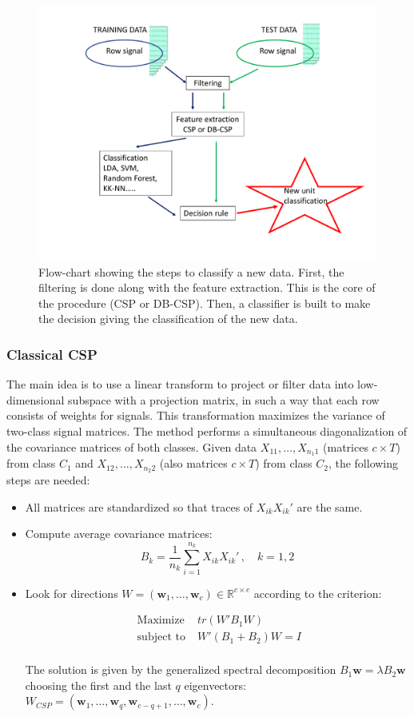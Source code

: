 \begin{figure}
    \centering
    \includegraphics[width=13cm]{Figure1.pdf}
    \caption{Flow-chart showing the steps to classify a new data. First, the filtering is done along with the feature extraction. This is the core of the procedure (CSP or DB-CSP). Then, a classifier is built to make the decision giving the classification of the new data. }
    \label{fig:F1}
\end{figure}

\subsubsection{Classical CSP}
The main idea is to use a linear transform to project or filter data into low-dimensional subspace with a projection matrix, in such a way that each row consists of weights for signals. This transformation maximizes the variance of two-class signal matrices. The method performs a simultaneous diagonalization of the covariance matrices of both classes.
Given data $X_{11}, \ldots, X_{n_1 1}$ (matrices $c \times T$) from class $C_1$ and $X_{12}, \ldots, X_{n_2 2}$ (also matrices $c \times T$) from class $C_2$, the following steps are needed:
\begin{itemize}
\item All matrices are standardized so that traces of $X_{i k}X_{i k}'$ are the same.
\item Compute average covariance matrices:
$$B_k = \frac{1}{n_k}\sum_{i=1}^{n_k}X_{i k} X_{i k}' \, , \quad k=1,2$$ 
\item Look for directions $W= (\mathbf{w}_1, \ldots, \mathbf{w}_c) \in \mathbb{R}^{c \times c}$ according to the criterion:

\begin{align*} 
\mbox{ Maximize}\; & tr(W'B_1W)\\
\mbox{ subject to}\;  & W'(B_1 + B_2)W = I\\
\end{align*}

The solution is given by the generalized spectral decomposition
$B_1\mathbf{w} = \lambda B_2 \mathbf{w}$
choosing the  first and the last $q$ eigenvectors: $W_{CSP}= (\mathbf{w}_1, \ldots, \mathbf{w}_q, \mathbf{w}_{c-q+1}, \ldots, \mathbf{w}_c)$.
\end{itemize}



